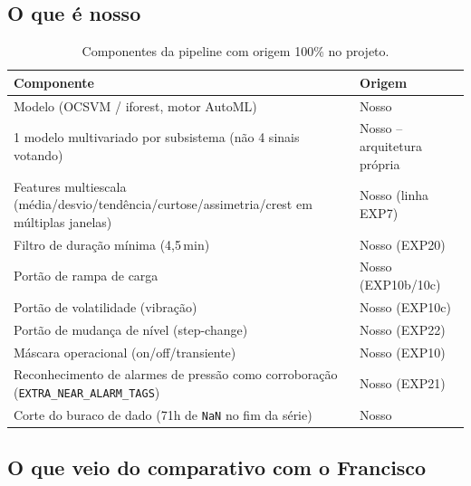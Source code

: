 \documentclass[11pt,a4paper]{article}
\begin{document}
\subsection{O que é nosso}
\label{sec:nosso}

\begin{table}[H]
\centering
\small
\begin{tabular}{p{5.5cm}p{9cm}}
\toprule
\textbf{Componente} & \textbf{Origem} \\
\midrule
Modelo (OCSVM / iforest, motor AutoML) & Nosso \\
1 modelo multivariado por subsistema (não 4 sinais votando) & Nosso -- arquitetura própria \\
Features multiescala (média/desvio/tendência/curtose/assimetria/crest em múltiplas janelas) & Nosso (linha EXP7) \\
Filtro de duração mínima (4,5\,min) & Nosso (EXP20) \\
Portão de rampa de carga & Nosso (EXP10b/10c) \\
Portão de volatilidade (vibração) & Nosso (EXP10c) \\
Portão de mudança de nível (step-change) & Nosso (EXP22) \\
Máscara operacional (on/off/transiente) & Nosso (EXP10) \\
Reconhecimento de alarmes de pressão como corroboração (\texttt{EXTRA\_NEAR\_ALARM\_TAGS}) & Nosso (EXP21) \\
Corte do buraco de dado (71h de \texttt{NaN} no fim da série) & Nosso \\
\bottomrule
\end{tabular}
\caption{Componentes da pipeline com origem 100\% no projeto.}
\end{table}

\subsection{O que veio do comparativo com o Francisco}
\label{sec:francisco}
\end{document}
